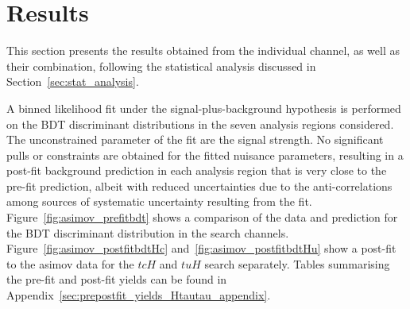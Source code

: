 \section{Results}
\label{sec:result}

This section presents the results obtained from the individual channel, as well as their combination,
following the statistical analysis discussed in Section~\ref{sec:stat_analysis}.

A binned likelihood fit under the signal-plus-background hypothesis is performed on the BDT discriminant distributions in the seven 
analysis regions considered. The unconstrained parameter of the fit are the signal 
strength.
No significant pulls or constraints are obtained for the fitted nuisance parameters, resulting in a post-fit background prediction in each analysis region that is
very close to the pre-fit prediction, albeit with reduced uncertainties due to the anti-correlations among sources of systematic uncertainty resulting from the fit.
Figure~\ref{fig:asimov_prefitbdt} shows a comparison of the data and prediction for the BDT discriminant distribution in
the search channels. Figure~\ref{fig:asimov_postfitbdtHc} and~\ref{fig:asimov_postfitbdtHu} show a post-fit to the asimov data for the $tcH$ and $tuH$ search separately.
Tables summarising the pre-fit and post-fit yields can be found in Appendix~\ref{sec:prepostfit_yields_Htautau_appendix}.

